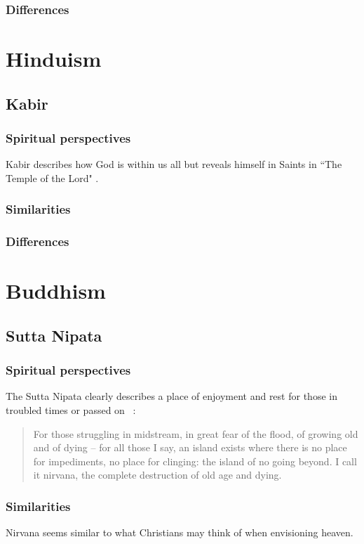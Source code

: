 \documentclass[11pt,a4paper]{scrartcl} %
\begin{document}
     \subsubsection{Differences}
    \section{Hinduism}
    \subsection{Kabir}
    \subsubsection{Spiritual perspectives}
    Kabir describes how God is within us all but reveals himself in Saints in ``The Temple of the Lord" \citealp[pg. 40-41]{eknath}. 
     \subsubsection{Similarities}
     \subsubsection{Differences}
    \section{Buddhism}
    \subsection{Sutta Nipata}   
\subsubsection{Spiritual perspectives}
 The Sutta Nipata clearly describes a place of enjoyment and rest for those in troubled times or passed on ~\citealp[pg. 200]{eknath}:
\begin{quote}
For those struggling in midstream, in great fear of the flood, of growing old and of dying – for all those I say, an island exists where there is no place for impediments, no place for clinging: the island of no going beyond.
I call it nirvana, the complete destruction of old age and dying.
\end{quote}
     \subsubsection{Similarities}
     Nirvana seems similar to what Christians may think of when envisioning heaven.
\end{document}
